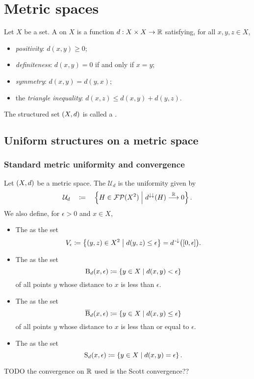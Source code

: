 \section{Metric spaces}
\begin{definition}
Let $X$ be a set. A  on $X$ is a function $d: X\times X\to \mathbb{R}$ satisfying, for all $x,y,z\in X$,
\begin{itemize}
\item \emph{positivity}: $d(x,y) \geq 0$;
\item \emph{definiteness}: $d(x,y) = 0$ \textup{if and only if} $x=y$;
\item \emph{symmetry}: $d(x,y) = d(y,x)$;
\item the \emph{triangle inequality}: $d(x,z) \leq d(x,y) + d(y,z)$.
\end{itemize}
The structured set $\left( X,d \right)$ is called a .
\end{definition}

\subsection{Uniform structures on a metric space}
\subsubsection{Standard metric uniformity and convergence}
\begin{definition}
Let $\left( X,d \right)$ be a metric space. The  $\mathcal{U}_d$ is the uniformity given by
\[ \mathcal{U}_d \quad\coloneqq\quad \left\{ H\in \operatorname{\mathcal{FP}}(X^2) \;\middle|\; d^{\downarrow\downarrow}(H) \overset{\mathbb{R}}{\longrightarrow} 0 \right\}.  \]
We also define, for $\epsilon >0$ and $x\in X$,
\begin{itemize}
\item The  as the set
\[ V_\epsilon \defeq \setbuilder{(y,z)\in X^2}{d(y,z)\leq \epsilon} = d^{\preimf}\big(\interval{0,\epsilon}\big). \]
\item The  as the set
\[ \operatorname{B}_d(x,\epsilon) \coloneqq \left\{ y\in X \;\middle|\; d(x,y)< \epsilon \right\} \]
of all points $y$ whose distance to $x$ is less than $\epsilon$.
\item The  as the set
\[ \operatorname{\overline{B}}_d(x,\epsilon) \coloneqq \left\{ y\in X \;\middle|\; d(x,y)\leq \epsilon \right\} \]
of all points $y$ whose distance to $x$ is less than or equal to $\epsilon$.
\item The  as the set
\[ \operatorname{S}_d(x,\epsilon) \coloneqq \left\{ y\in X \;\middle|\; d(x,y) = \epsilon \right\}. \]
\end{itemize}
\end{definition}
TODO the convergence on $\mathbb{R}$ used is the Scott convergence??

